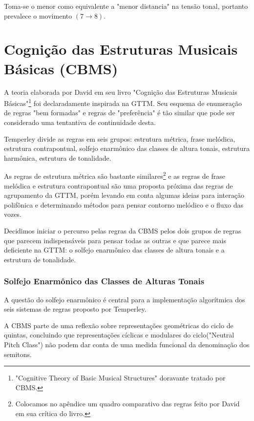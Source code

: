 \documentclass[
	12pt,				%
	openright,			%
	twoside,			%
	a4paper,			%
	english,			%
	french,				%
	spanish,			%
	brazil				%
	]{abntex2}
\begin{document}
Toma-se o menor como equivalente a "menor distancia" na tensão tonal, portanto prevalece o movimento $(7 \to 8)$. 



\section{Cognição das Estruturas Musicais Básicas (CBMS)}

A teoria elaborada por David  em seu livro "Cognição das Estruturas Musicais Básicas"\footnote{"Cognitive Theory of Basic Musical Structures" doravante tratado por CBMS. } foi declaradamente inspirada na GTTM. Seu esquema de enumeração de regras "bem formadas" e regras de "preferência" é tão similar que pode ser considerado uma tentantiva de continuidade desta.

Temperley divide as regras em seis grupos: estrutura métrica, frase melódica, estrutura contrapontual, solfejo enarmônico das classes de altura tonais, estrutura harmônica, estrutura de tonalidade.

As regras de estrutura métrica são bastante similares\footnote{Colocamos no apêndice um quadro comparativo das regras feito por David  em sua crítica do livro.  } e as regras de frase melódica e estrutura contrapontual são uma proposta próxima das regras de agrupamento da GTTM, porém levando em conta algumas ideias para interação polifônica e determinando métodos para pensar contorno melódico e o fluxo das vozes. 

Decidimos iniciar o percurso pelas regras da CBMS pelos dois grupos de regras que parecem indispensáveis para pensar todas as outras e que parece mais deficiente na GTTM: o solfejo enarmônico das classes de altura tonais e a estrutura de tonalidade. 


\subsubsection{Solfejo Enarmônico das Classes de Alturas Tonais}

A questão do solfejo enarmônico é central para a implementação algorítmica dos seis sistemas de regras proposto por Temperley.

A CBMS parte de uma reflexão sobre representações geométricas do ciclo de quintas, concluindo que representações cíclicas e modulares do ciclo("Neutral Pitch Class") não podem dar conta de uma medida funcional da denominação dos semitons.
\end{document}
